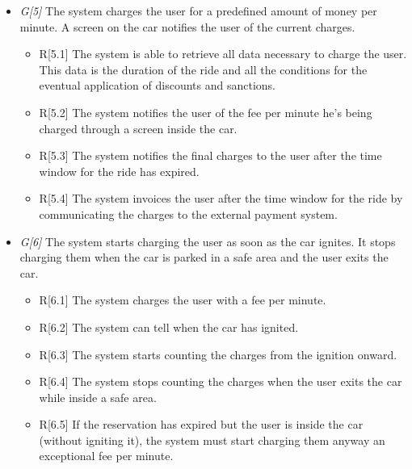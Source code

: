 \begin{itemize}
				\item \textit{G[5]} The system charges the user for a predefined amount of money per minute. A screen on the car notifies the user of the current charges.
					\begin{itemize}
						\item R[5.1] The system is able to retrieve all data necessary to charge the user. This data is the duration of the ride and all the conditions for the eventual application of discounts and sanctions.
						\item R[5.2] The system notifies the user of the fee per minute he's being charged through a screen inside the car.
						\item R[5.3] The system notifies the final charges to the user after the time window for the ride has expired.
						\item R[5.4] The system invoices the user after the time window for the ride by communicating the charges to the external payment system. 
						
					\end{itemize}
				
				\item \textit{G[6]} The system starts charging the user as soon as the car ignites. It stops charging them when the car is parked in a safe area and the user exits the car.
					\begin{itemize}
						\item R[6.1] The system charges the user with a fee per minute.
						\item R[6.2] The system can tell when the car has ignited. 
						\item R[6.3] The system starts counting the charges from the ignition onward. %
						\item R[6.4] The system stops counting the charges when the user exits the car while inside a safe area.
						\item R[6.5] If the reservation has expired but the user is inside the car (without igniting it), the system must start charging them anyway an exceptional fee per minute. %
					\end{itemize}
					

\end{itemize}
